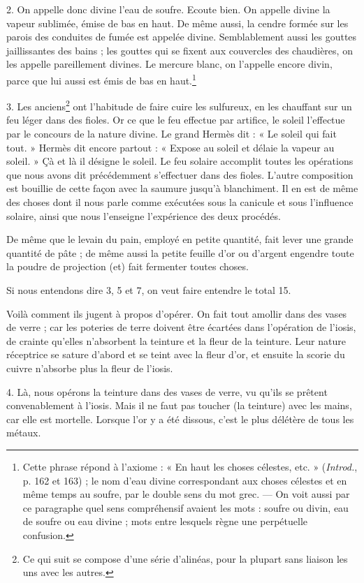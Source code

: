 \documentclass[a4paper, 11pt, oneside, polutonikogreek, french]{article}
\begin{document}
2. On appelle donc divine l'eau de soufre. Ecoute bien. On appelle divine la vapeur sublimée, émise de bas en haut. De même aussi, la cendre formée sur les parois des conduites de fumée est appelée divine. Semblablement aussi les gouttes jaillissantes des bains ; les gouttes qui se fixent aux couvercles des chaudières, on les appelle pareillement divines. Le mercure blanc, on l'appelle encore divin, parce que lui aussi est émis de bas en haut.\footnote{Cette phrase répond à l'axiome : « En haut les choses célestes, etc. » (\emph{Introd.}, p. 162 et 163) ; le nom d'eau divine correspondant aux choses célestes et en même temps au soufre, par le double sens du mot grec. --- On voit aussi par ce paragraphe quel sens compréhensif avaient les mots : soufre ou divin, eau de soufre ou eau divine ; mots entre lesquels règne une perpétuelle confusion.}

3. Les anciens\footnote{Ce qui suit se compose d'une série d'alinéas, pour la plupart sans liaison les uns avec les autres.} ont l'habitude de faire cuire les sulfureux, en les chauffant sur un feu léger dans des fioles. Or ce que le feu effectue par artifice, le soleil l'effectue par le concours de la nature divine. Le grand Hermès dit : « Le soleil qui fait tout. » Hermès dit encore partout : « Expose au soleil et délaie la vapeur au soleil. » Çà et là il désigne le soleil. Le feu solaire accomplit toutes les opérations que nous avons dit précédemment s'effectuer dans des fioles. L'autre composition est bouillie de cette façon avec la saumure jusqu'à blanchiment. Il en est de même des choses dont il nous parle comme exécutées sous la canicule et sous l'influence solaire, ainsi que nous l'enseigne l'expérience des deux procédés.

De même que le levain du pain, employé en petite quantité, fait lever une grande quantité de pâte ; de même aussi la petite feuille d'or ou d'argent engendre toute la poudre de projection (et) fait fermenter toutes choses.

Si nous entendons dire 3, 5 et 7, on veut faire entendre le total 15.

Voilà comment ils jugent à propos d'opérer. On fait tout amollir dans des vases de verre ; car les poteries de terre doivent être écartées dans l'opération de l'iosis, de crainte qu'elles n'absorbent la teinture et la fleur de la teinture. Leur nature réceptrice se sature d'abord et se teint avec la fleur d'or, et ensuite la scorie du cuivre n'absorbe plus la fleur de l'iosis.

4. Là, nous opérons la teinture dans des vases de verre, vu qu'ils se prêtent convenablement à l'iosis. Mais il ne faut pas toucher (la teinture) avec les mains, car elle est mortelle. Lorsque l'or y a été dissous, c'est le plus délétère de tous les métaux.
\end{document}
